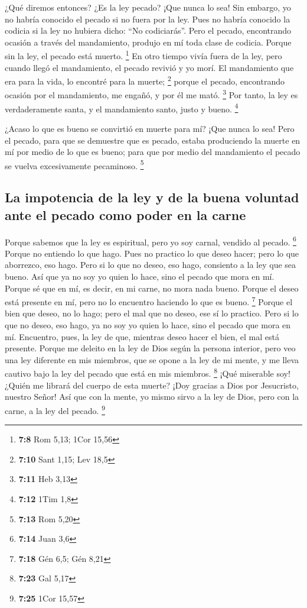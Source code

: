  ¿Qué diremos entonces? ¿Es la ley pecado? ¡Que nunca lo
sea! Sin embargo, yo no habría conocido el pecado si no fuera por la
ley. Pues no habría conocido la codicia si la ley no hubiera dicho: ``No
codiciarás''.  Pero el pecado, encontrando ocasión a
través del mandamiento, produjo en mí toda clase de codicia. Porque sin
la ley, el pecado está muerto. \footnote{\textbf{7:8} Rom 5,13; 1Cor
  15,56}  En otro tiempo vivía fuera de la ley, pero
cuando llegó el mandamiento, el pecado revivió y yo morí.
 El mandamiento que era para la vida, lo encontré para la
muerte; \footnote{\textbf{7:10} Sant 1,15; Lev 18,5} 
porque el pecado, encontrando ocasión por el mandamiento, me engañó, y
por él me mató. \footnote{\textbf{7:11} Heb 3,13}  Por
tanto, la ley es verdaderamente santa, y el mandamiento santo, justo y
bueno. \footnote{\textbf{7:12} 1Tim 1,8}

 ¿Acaso lo que es bueno se convirtió en muerte para mí?
¡Que nunca lo sea! Pero el pecado, para que se demuestre que es pecado,
estaba produciendo la muerte en mí por medio de lo que es bueno; para
que por medio del mandamiento el pecado se vuelva excesivamente
pecaminoso. \footnote{\textbf{7:13} Rom 5,20}

\hypertarget{la-impotencia-de-la-ley-y-de-la-buena-voluntad-ante-el-pecado-como-poder-en-la-carne}{%
\subsection{La impotencia de la ley y de la buena voluntad ante el
pecado como poder en la
carne}\label{la-impotencia-de-la-ley-y-de-la-buena-voluntad-ante-el-pecado-como-poder-en-la-carne}}

 Porque sabemos que la ley es espiritual, pero yo soy
carnal, vendido al pecado. \footnote{\textbf{7:14} Juan 3,6}
 Porque no entiendo lo que hago. Pues no practico lo que
deseo hacer; pero lo que aborrezco, eso hago.  Pero si lo
que no deseo, eso hago, consiento a la ley que sea bueno.
 Así que ya no soy yo quien lo hace, sino el pecado que
mora en mí.  Porque sé que en mí, es decir, en mi carne,
no mora nada bueno. Porque el deseo está presente en mí, pero no lo
encuentro haciendo lo que es bueno. \footnote{\textbf{7:18} Gén 6,5; Gén
  8,21}  Porque el bien que deseo, no lo hago; pero el
mal que no deseo, ese sí lo practico.  Pero si lo que no
deseo, eso hago, ya no soy yo quien lo hace, sino el pecado que mora en
mí.  Encuentro, pues, la ley de que, mientras deseo hacer
el bien, el mal está presente.  Porque me deleito en la
ley de Dios según la persona interior,  pero veo una ley
diferente en mis miembros, que se opone a la ley de mi mente, y me lleva
cautivo bajo la ley del pecado que está en mis miembros. \footnote{\textbf{7:23}
  Gal 5,17}  ¡Qué miserable soy! ¿Quién me librará del
cuerpo de esta muerte?  ¡Doy gracias a Dios por
Jesucristo, nuestro Señor! Así que con la mente, yo mismo sirvo a la ley
de Dios, pero con la carne, a la ley del pecado. \footnote{\textbf{7:25}
  1Cor 15,57}

